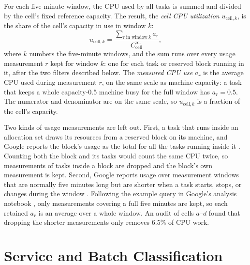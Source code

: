 \documentclass{UNCC-thesis}
\begin{document}
For each five-minute window, the CPU used by all tasks is summed and divided
by the cell's fixed reference capacity. The result, the \emph{cell CPU
utilization} \(u_{\mathrm{cell},k}\), is the share of the cell's capacity in use in
window \(k\):
\begin{equation}
  u_{\mathrm{cell},k}
  =
  \frac{\displaystyle\sum_{r\ \text{in window}\ k} a_r}
         {C^{\mathrm{ref}}_{\mathrm{cell}}} ,
  \label{eq:clusterdata-utilization}
\end{equation}
where \(k\) numbers the five-minute windows, and the sum runs over every
usage measurement \(r\) kept for window \(k\): one for each task or reserved
block running in it, after the two filters described below. The
\emph{measured CPU use} \(a_r\) is the average CPU used during
measurement \(r\), on the same scale as machine capacity: a task that keeps a
whole capacity-0.5 machine
busy for the full window has \(a_r=0.5\). The numerator and denominator are
on the same scale, so \(u_{\mathrm{cell},k}\) is a fraction of the cell's capacity.

Two kinds of usage measurements are left out. First, a task that runs inside
an allocation set draws its resources from a reserved block on its machine,
and Google reports the block's usage as the total for all the tasks running
inside it \cite{wilkes2020clusterdata2019}. Counting both the block and its
tasks would count the same CPU twice, so measurements of tasks inside a block
are dropped and the block's own measurement is kept. Second, Google reports
usage over measurement windows that are normally five minutes long but are
shorter when a task starts, stops, or changes during the window
\cite{wilkes2020clusterdata2019, googleTraceFormatV3}. Following the example
query in Google's analysis notebook \cite{googleClusterAnalysisColab}, only
measurements covering a full five minutes are kept, so each retained \(a_r\)
is an average over a whole window. An audit of cells \(a\)--\(d\) found that
dropping the shorter measurements only removes 6.5\% of CPU work.

\section{Service and Batch Classification}
\label{subsec:clusterdata-tier-split}
\end{document}
